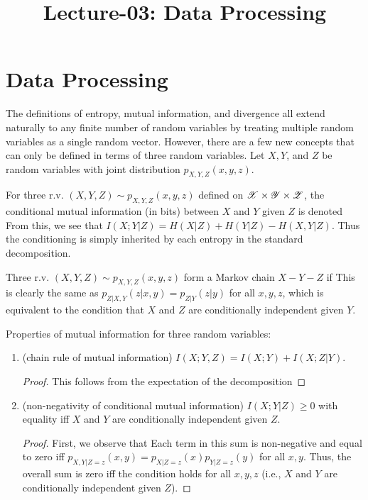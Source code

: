 \documentclass[letterpaper,10pt,english]{article}
\title{Lecture-03: Data Processing}
\author{}
\begin{document}
\maketitle

\section{Data Processing}
The definitions of entropy, mutual information, and divergence all extend naturally to any finite number of random variables by treating multiple random variables as a single random vector. However, there are a few new concepts that can only be defined in terms of three random variables. Let $X, Y$, and $Z$ be random variables with joint distribution $p_{X,Y,Z}(x,y,z)$. 
\begin{defn} 
For three r.v. $(X,Y,Z) \sim p_{X,Y,Z}(x,y,z)$ defined on $\mathscr{X} \times \mathscr{Y} \times \mathscr{Z}$, 
the conditional mutual information (in bits) between $X$ and $Y$ given $Z$ is denoted 
From this, we see that $I(X;Y | Z) = H(X | Z) + H(Y|Z) - H(X,Y |Z)$. 
Thus the conditioning is simply inherited by each entropy in the standard decomposition. 
\end{defn} 
\begin{defn} 
Three r.v. $(X, Y, Z) \sim p_{X,Y, Z} (x, y, z)$ form a Markov chain $X -Y - Z$ if 
This is clearly the same as $p_{Z|X,Y} (z|x, y) = p_{Z|Y} (z | y)$ for all $x, y, z$, 
which is equivalent to the condition that $X$ and $Z$ are conditionally independent given $Y$. 
\end{defn} 

\begin{lem}
Properties of mutual information for three random variables:
\begin{enumerate}
\item (chain rule of mutual information) $I(X;Y,Z)=I(X;Y)+I(X;Z|Y)$. 
\begin{proof}
This follows from the expectation of the decomposition
\end{proof} 
\item (non-negativity of conditional mutual information) $I (X ; Y |Z ) \ge 0$ with equality iff $X$ and $Y$ are conditionally independent given $Z$.
\begin{proof}
First, we observe that
Each term in this sum is non-negative and equal to zero iff $p_{X,Y|Z=z}(x,y) = p_{X|Z=z}(x)p_{Y|Z=z}(y)$ for all $x,y$. 
Thus, the overall sum is zero iff the condition holds for all $x, y, z$ (i.e., $X$ and $Y$ are conditionally independent given $Z$). 
\end{proof} 
\end{enumerate}
\end{lem} 
    
\end{document}
